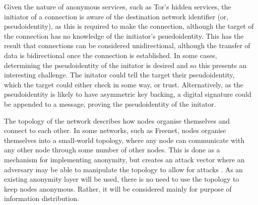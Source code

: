 			Given the nature of anonymous services, such as Tor's hidden services, the initiator of a connection is aware of the destination network identifier (or, pseudoidentity), as this is required to make the connection, although the target of the connection has no knowledge of the initiator's psuedoidentity. This has the result that connections can be considered unidirectional, although the transfer of data is bidirectional once the connection is established. In some cases, determining the pseudoidentity of the initator is desired and so this presents an interesting challenge. The initator could tell the target their pseudoidentity, which the target could either check in some way, or trust. Alternatively, as the pseudoidentity is likely to have asymmetric key backing, a digital signature could be appended to a message, proving the pseudoidentity of the initator.
			
			
			
			The topology of the network describes how nodes organise themselves and connect to each other. In some networks, such as Freenet, nodes organise themselves into a small-world topology, where any node can communicate with any other node through some number of other nodes. This is done as a mechanism for implementing anonymity, but creates an attack vector where an adversary may be able to manipulate the topology to allow for attacks \cite{pretre2005attacks}. As an existing anonymity layer will be used, there is no need to use the topology to keep nodes anonymous. Rather, it will be considered mainly for purpose of information distribution.
			
